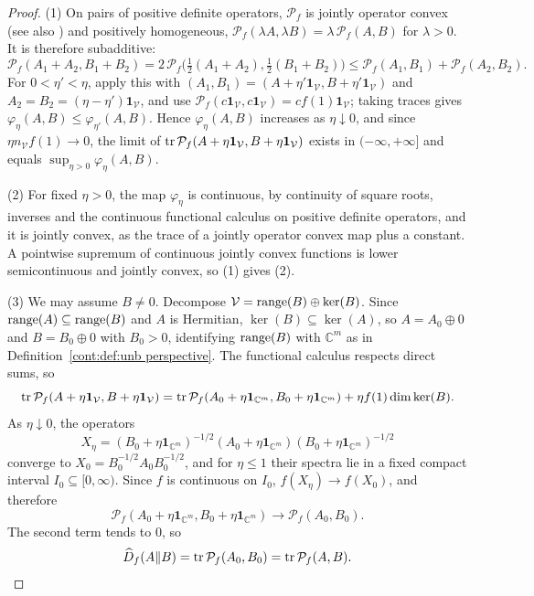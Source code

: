 \begin{proof}
(1) On pairs of positive definite operators, $\mathcal{P}_f$ is jointly operator convex \cite{EbadianNikoufarGordji2011} (see also \cite{Effros2009}) and positively homogeneous, $\mathcal{P}_f(\lambda A,\lambda B)=\lambda\,\mathcal{P}_f(A,B)$ for $\lambda>0$. It is therefore subadditive:
\[
\mathcal{P}_f(A_1+A_2,B_1+B_2)=2\,\mathcal{P}_f\big(\tfrac12(A_1+A_2),\tfrac12(B_1+B_2)\big)\leq\mathcal{P}_f(A_1,B_1)+\mathcal{P}_f(A_2,B_2).
\]
For $0<\eta'<\eta$, apply this with $(A_1,B_1)=(A+\eta'\mathbf{1}_{\mathcal{V}},B+\eta'\mathbf{1}_{\mathcal{V}})$ and $A_2=B_2=(\eta-\eta')\mathbf{1}_{\mathcal{V}}$, and use $\mathcal{P}_f(c\mathbf{1}_{\mathcal{V}},c\mathbf{1}_{\mathcal{V}})=cf(1)\mathbf{1}_{\mathcal{V}}$; taking traces gives $\varphi_\eta(A,B)\leq\varphi_{\eta'}(A,B)$. Hence $\varphi_\eta(A,B)$ increases as $\eta\downarrow0$, and since $\eta n_{\mathcal{V}} f(1)\to0$, the limit of $\operatorname{tr}\mathcal{P}_f(A+\eta\mathbf{1}_{\mathcal{V}},B+\eta\mathbf{1}_{\mathcal{V}})$ exists in $(-\infty,+\infty]$ and equals $\sup_{\eta>0}\varphi_\eta(A,B)$.

(2) For fixed $\eta>0$, the map $\varphi_\eta$ is continuous, by continuity of square roots, inverses and the continuous functional calculus on positive definite operators, and it is jointly convex, as the trace of a jointly operator convex map plus a constant. A pointwise supremum of continuous jointly convex functions is lower semicontinuous and jointly convex, so (1) gives (2).

(3) We may assume $B\neq0$. Decompose $\mathcal{V}=\operatorname{range}(B)\oplus\ker(B)$. Since $\operatorname{range}(A)\subseteq\operatorname{range}(B)$ and $A$ is Hermitian, $\ker(B)\subseteq\ker(A)$, so $A=A_0\oplus0$ and $B=B_0\oplus0$ with $B_0>0$, identifying $\operatorname{range}(B)$ with $\mathbb{C}^m$ as in Definition~\ref{cont:def:unb perspective}. The functional calculus respects direct sums, so
\[
\operatorname{tr}\mathcal{P}_f(A+\eta\mathbf{1}_{\mathcal{V}},B+\eta\mathbf{1}_{\mathcal{V}})=\operatorname{tr}\mathcal{P}_f(A_0+\eta\mathbf{1}_{\mathbb{C}^m},B_0+\eta\mathbf{1}_{\mathbb{C}^m})+\eta f(1)\dim\ker(B).
\]
As $\eta\downarrow0$, the operators
\[
X_\eta=(B_0+\eta\mathbf{1}_{\mathbb{C}^m})^{-1/2}(A_0+\eta\mathbf{1}_{\mathbb{C}^m})(B_0+\eta\mathbf{1}_{\mathbb{C}^m})^{-1/2}
\]
converge to $X_0=B_0^{-1/2}A_0B_0^{-1/2}$, and for $\eta\leq1$ their spectra lie in a fixed compact interval $I_0\subseteq[0,\infty)$. Since $f$ is continuous on $I_0$, $f(X_\eta)\to f(X_0)$, and therefore
\[
\mathcal{P}_f(A_0+\eta\mathbf{1}_{\mathbb{C}^m},B_0+\eta\mathbf{1}_{\mathbb{C}^m})\to\mathcal{P}_f(A_0,B_0).
\]
The second term tends to $0$, so
\[
\widehat{D}_f(A\|B)=\operatorname{tr}\mathcal{P}_f(A_0,B_0)=\operatorname{tr}\mathcal{P}_f(A,B).
\]
\end{proof}

